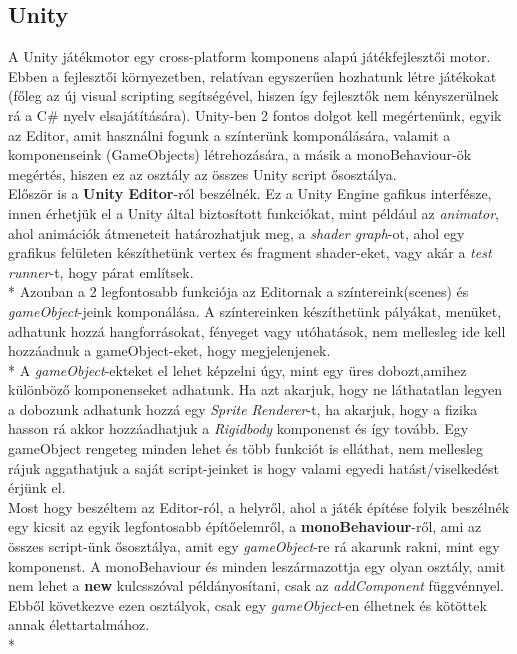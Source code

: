 \subsection{Unity}
A Unity játékmotor egy cross-platform komponens alapú játékfejlesztői motor. Ebben a fejlesztői környezetben, relatívan egyszerűen hozhatunk létre játékokat (főleg az új visual scripting segítségével, hiszen így fejlesztők nem kényszerülnek rá a C\# nyelv elsajátítására). Unity-ben 2 fontos dolgot kell megértenünk, egyik az Editor, amit használni fogunk a színterünk komponálására, valamit a komponenseink (GameObjects) létrehozására, a másik a monoBehaviour-ök megértés, hiszen ez az osztály az összes Unity script ősosztálya.\\
Először is a \textbf{Unity Editor}-ról beszélnék. Ez a Unity Engine gafikus interfésze, innen érhetjük el a Unity által biztosított funkciókat, mint például az \textit{animator}, ahol animációk átmeneteit határozhatjuk meg, a \textit{shader graph}-ot, ahol egy grafikus felületen készíthetünk vertex és fragment shader-eket, vagy akár a \textit{test runner}-t, hogy párat említsek.\\*
Azonban a 2 legfontosabb funkciója az Editornak a színtereink(scenes) és \textit{gameObject}-jeink komponálása. A színtereinken készíthetünk pályákat, menüket, adhatunk hozzá hangforrásokat, fényeget vagy utóhatások, nem mellesleg ide kell hozzáadnuk a gameObject-eket, hogy megjelenjenek.\\*
A \textit{gameObject}-ekteket el lehet képzelni úgy, mint egy üres dobozt,amihez különböző komponenseket adhatunk. Ha azt akarjuk, hogy ne láthatatlan legyen a dobozunk adhatunk hozzá egy \textit{Sprite Renderer}-t, ha akarjuk, hogy a fizika hasson rá akkor hozzáadhatjuk a \textit{Rigidbody} komponenst és így tovább. Egy gameObject rengeteg minden lehet és több funkciót is elláthat, nem mellesleg rájuk aggathatjuk a saját script-jeinket is hogy valami egyedi hatást/viselkedést érjünk el.\\
Most hogy beszéltem az Editor-ról, a helyről, ahol a játék építése folyik beszélnék egy kicsit az egyik legfontosabb építőelemről, a \textbf{monoBehaviour}-ről, ami az összes script-ünk ősosztálya, amit egy \textit{gameObject}-re rá akarunk rakni, mint egy komponenst. A monoBehaviour és minden leszármazottja egy olyan osztály, amit nem lehet a \textbf{new} kulcsszóval példányosítani, csak az \textit{addComponent} függvénnyel. Ebből következve ezen osztályok, csak egy \textit{gameObject}-en élhetnek és kötöttek annak élettartalmához.\\*
